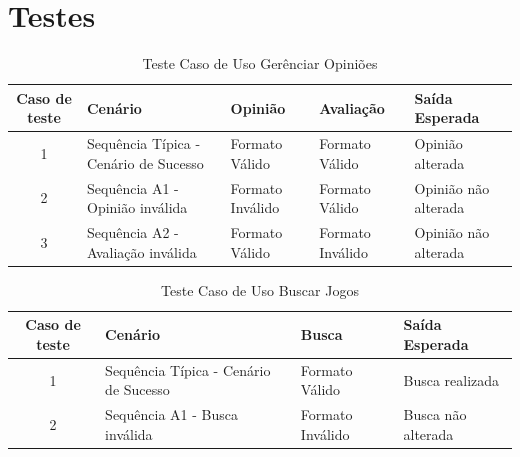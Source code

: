 \documentclass[a4paper,11pt]{article}
\begin{document}
\section{Testes}
	\begin{center}
	\begin{table}[H]
		\begin{tabularx}{\textwidth}{|c|X|X|X|X|} \hline
			\textbf{Caso de teste} & \textbf{Cenário} & \textbf{Opinião} & \textbf{Avaliação} & \textbf{Saída Esperada} \\
			\hline
			1 & Sequência Típica - Cenário de Sucesso & Formato Válido & Formato Válido & Opinião alterada\\ \hline
			2 & Sequência A1 - Opinião inválida & Formato Inválido & Formato Válido & Opinião não alterada\\ \hline
			3 & Sequência A2 - Avaliação inválida & Formato Válido & Formato Inválido & Opinião não alterada\\ \hline
			
		\end{tabularx}
		\caption{Teste Caso de Uso Gerênciar Opiniões}
	\end{table}
	\end{center}
	
	\begin{center}
	\begin{table}[H]
		\begin{tabularx}{\textwidth}{|c|X|X|X|} \hline
			\textbf{Caso de teste} & \textbf{Cenário} & \textbf{Busca} & \textbf{Saída Esperada} \\
			\hline
			1 & Sequência Típica - Cenário de Sucesso & Formato Válido & Busca realizada\\ \hline
			2 & Sequência A1 - Busca inválida & Formato Inválido & Busca não alterada\\ \hline
			
		\end{tabularx}
		\caption{Teste Caso de Uso Buscar Jogos}
	\end{table}
	\end{center}
	
\end{document}
